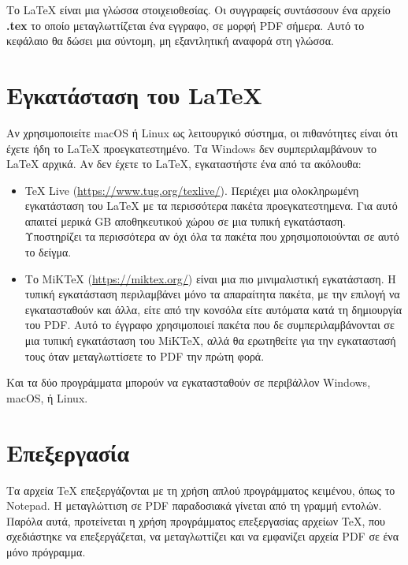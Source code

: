\documentclass[inscr,ack,preface]{dimscthesis}
\begin{document}
Το \LaTeX{} είναι μια γλώσσα στοιχειοθεσίας.
Οι συγγραφείς συντάσσουν ένα αρχείο \textbf{.tex} το οποίο μεταγλωττίζεται ένα εγγραφο, σε μορφή PDF σήμερα.
Αυτό το κεφάλαιο θα δώσει μια σύντομη, μη εξαντλητική αναφορά στη γλώσσα.

\section{Εγκατάσταση του \LaTeX} \label{installing_latex}

Αν χρησιμοποιείτε macOS ή Linux ως λειτουργικό σύστημα, οι πιθανότητες είναι ότι έχετε ήδη το \LaTeX{} προεγκατεστημένο.
Τα Windows δεν συμπεριλαμβάνουν το \LaTeX{} αρχικά.
Αν δεν έχετε το \LaTeX{}, εγκαταστήστε ένα από τα ακόλουθα:
\begin{itemize}
    \item TeX Live (\url{https://www.tug.org/texlive/}).
    Περιέχει μια ολοκληρωμένη εγκατάσταση του \LaTeX{} με τα περισσότερα πακέτα προεγκατεστημενα.
    Για αυτό απαιτεί μερικά GB αποθηκευτικού χώρου σε μια τυπική εγκατάσταση.
    Υποστηρίζει τα περισσότερα αν όχι όλα τα πακέτα που χρησιμοποιούνται σε αυτό το δείγμα.
    \item Το MiKTeX (\url{https://miktex.org/}) είναι μια πιο μινιμαλιστική εγκατάσταση.
    Η τυπική εγκατάσταση περιλαμβάνει μόνο τα απαραίτητα πακέτα, με την επιλογή να εγκατασταθούν και άλλα, είτε από την κονσόλα είτε αυτόματα κατά τη δημιουργία του PDF.
    Αυτό το έγγραφο χρησιμοποιεί πακέτα που δε συμπεριλαμβάνονται σε μια τυπική εγκατάσταση του MiKTeX, αλλά θα ερωτηθείτε για την εγκαταστασή τους όταν μεταγλωττίσετε το PDF την πρώτη φορά.
\end{itemize}

Και τα δύο προγράμματα μπορούν να εγκατασταθούν σε περιβάλλον Windows, macOS, ή Linux.

\section{Επεξεργασία} \label{editing}

Τα αρχεία \TeX{} επεξεργάζονται με τη χρήση απλού προγράμματος κειμένου, όπως το Notepad.
Η μεταγλώττιση σε PDF παραδοσιακά γίνεται από τη γραμμή εντολών.
Παρόλα αυτά, προτείνεται η χρήση προγράμματος επεξεργασίας αρχείων \TeX{}, που σχεδιάστηκε να επεξεργάζεται, να μεταγλωττίζει και να εμφανίζει αρχεία PDF σε ένα μόνο πρόγραμμα.
\end{document}
